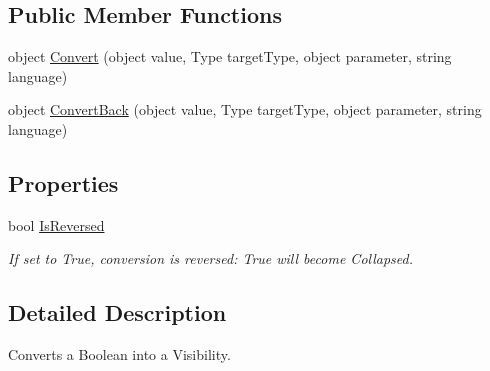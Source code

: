 \subsection*{Public Member Functions}
\begin{DoxyCompactItemize}
\item 
object \hyperlink{class_field_service_1_1_win_r_t_1_1_utilities_1_1_boolean_to_visibility_converter_a418343b42e581a57397e76ba765be38b}{Convert} (object value, Type target\+Type, object parameter, string language)
\item 
object \hyperlink{class_field_service_1_1_win_r_t_1_1_utilities_1_1_boolean_to_visibility_converter_a4c5c57628081384acb1e1e08bc09ed9e}{Convert\+Back} (object value, Type target\+Type, object parameter, string language)
\end{DoxyCompactItemize}
\subsection*{Properties}
\begin{DoxyCompactItemize}
\item 
bool \hyperlink{class_field_service_1_1_win_r_t_1_1_utilities_1_1_boolean_to_visibility_converter_abfc5b01c9ba3db01a6aa7cfa6831e678}{Is\+Reversed}
\begin{DoxyCompactList}\small\item\em If set to True, conversion is reversed\+: True will become Collapsed. \end{DoxyCompactList}\end{DoxyCompactItemize}


\subsection{Detailed Description}
Converts a Boolean into a Visibility. 



